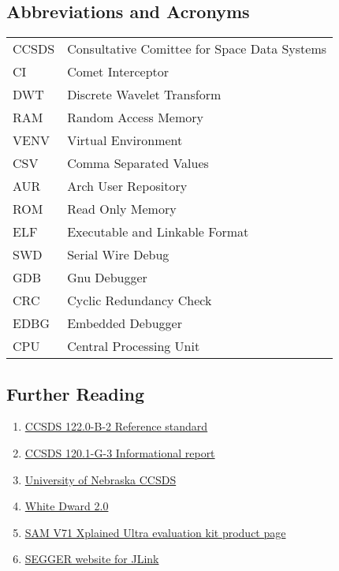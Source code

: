 \documentclass[12pt, a4paper]{article}
\begin{document}
\subsection{Abbreviations and Acronyms}
\begin{tabular}{ll}
    CCSDS   & Consultative Comittee for Space Data Systems \\
    CI      & Comet Interceptor \\
    DWT     & Discrete Wavelet Transform \\
    RAM     & Random Access Memory \\
    VENV    & Virtual Environment \\
    CSV     & Comma Separated Values \\
    AUR     & Arch User Repository \\
    ROM     & Read Only Memory \\
    ELF     & Executable and Linkable Format \\
    SWD     & Serial Wire Debug \\
    GDB     & Gnu Debugger \\
    CRC     & Cyclic Redundancy Check \\
    EDBG    & Embedded Debugger \\
    CPU     & Central Processing Unit \\
\end{tabular}

\newpage
\subsection{Further Reading} 
\label{links}

\begin{enumerate}
    \item\href{https://public.ccsds.org/Pubs/122x0b2.pdf}{CCSDS 122.0-B-2 Reference standard}\label{lnk:standard}
    \item\href{https://public.ccsds.org/Pubs/120x1g3.pdf}{CCSDS 120.1-G-3 Informational report}\label{lnk:g}
    \item\href{http://hyperspectral.unl.edu/download.htm}{University of Nebraska CCSDS}\label{lnk:uon}
    \item\href{https://essr.esa.int/project/whitedwarf-2-0}{White Dward 2.0}\label{lnk:wd}
    \item\href{https://www.microchip.com/en-us/development-tool/atsamv71-xult}{SAM V71 Xplained Ultra evaluation kit product page}\label{lnk:xplained}
    \item\href{https://www.segger.com/downloads/jlink/}{SEGGER website for JLink}\label{lnk:4}
\end{enumerate}
\end{document}
